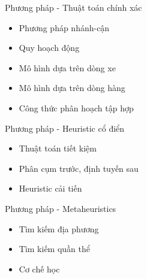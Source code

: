\begin{frame}{Phương pháp - Thuật toán chính xác}
  \begin{itemize}
    \item Phương pháp nhánh-cận
    \item Quy hoạch động
    \item Mô hình dựa trên dòng xe 
    \item Mô hình dựa trên dòng hàng
    \item Công thức phân hoạch tập hợp
  \end{itemize}
\end{frame}

\begin{frame}{Phương pháp - Heuristic cổ điển}
  \begin{itemize}
    \item Thuật toán tiết kiệm
    \item Phân cụm trước, định tuyến sau 
    \item Heuristic cải tiến
  \end{itemize}
\end{frame}

\begin{frame}{Phương pháp - Metaheuristics}
  \begin{itemize}
    \item Tìm kiếm địa phương
    \item Tìm kiếm quần thể 
    \item Cơ chế học
  \end{itemize}
\end{frame}

